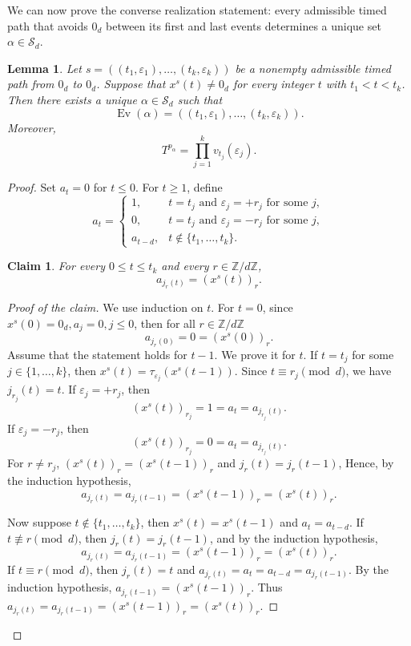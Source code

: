 \documentclass[11pt]{amsart}
\newtheorem{lemma}[theorem]{Lemma}
\newtheorem{claim}[theorem]{Claim}
\theoremstyle{definition}
\theoremstyle{remark}
\newcommand{\Z}{\mathbb Z}
\newcommand{\Sd}{\mathcal S_d}
\begin{document}
 
 We can now prove the converse realization statement: every admissible timed path that avoids $0_d$ between its first and last events determines a unique set $\alpha\in\Sd$.


\begin{lemma}\label{lem:path-realisation}
Let $s=((t_1,\varepsilon_1),\ldots,(t_k,\varepsilon_k))$ be a nonempty admissible timed path from $0_d$ to $0_d$.  Suppose that $x^s(t)\neq0_d$ for
every integer $t$ with $t_1<t<t_k$.  Then there exists a unique
$\alpha\in\Sd$ such that
\[
  \operatorname{Ev}(\alpha)
 =((t_1,\varepsilon_1),\ldots,(t_k,\varepsilon_k)).  
\]
Moreover, 
\[
 T^{p_\alpha}=\prod_{j=1}^k v_{t_j}(\varepsilon_j).   
\]
\end{lemma}

\begin{proof}
Set $a_t=0$ for $t\leq0$.  For $t\geq1$, define
\[
 a_t=
 \begin{cases}
  1,&t=t_j\text{ and }\varepsilon_j=+r_j\text{ for some }j,\\
  0,&t=t_j\text{ and }\varepsilon_j=-r_j\text{ for some }j,\\
  a_{t-d},&t\notin\{t_1,\ldots,t_k\}.
 \end{cases}
\]

\begin{claim} \label{claim:a-s}
    For every $0\leq t\leq t_k$ and every $r\in\Z/d\Z$, 
\[
 a_{j_r(t)}=(x^s(t))_r.
\]
\end{claim}
 
\begin{proof}[Proof of the claim]
 We use induction on $t$.
For $t=0$, since $x^s(0)=0_d, a_j=0, j\leq0$, then for all $r\in\mathbb Z/d\mathbb Z$
\[
a_{j_r(0)}=0=(x^s(0))_r .
\]
 Assume that the statement holds for $t-1$. We prove it for $t$.
If $t=t_j$ for some $j\in\{1,\ldots,k\}$, then $x^s(t)=\tau_{\varepsilon_j}(x^s(t-1)).$
Since $t\equiv r_j\pmod d$, we have $j_{r_j}(t)=t$.
If $\varepsilon_j=+r_j$, then
\[
(x^s(t))_{r_j}=1=a_t=a_{j_{r_j}(t)}.
\]
If $\varepsilon_j=-r_j$, then
\[
(x^s(t))_{r_j}=0=a_t=a_{j_{r_j}(t)}.
\]
For $r\neq r_j$, $(x^s(t))_r=(x^s(t-1))_r$ and $j_r(t)=j_r(t-1)$,
Hence, by the induction hypothesis,
\[
a_{j_r(t)}=a_{j_r(t-1)}=(x^s(t-1))_r=(x^s(t))_r.
\]

Now suppose $t\notin\{t_1,\ldots,t_k\}$,
then $x^s(t)=x^s(t-1)$ and $a_t=a_{t-d}$.
If $t\not\equiv r\pmod d$, then $j_r(t)=j_r(t-1)$, and by the induction hypothesis, 
\[
a_{j_r(t)}=a_{j_r(t-1)}=(x^s(t-1))_r=(x^s(t))_r.
\]
If $t\equiv r\pmod d$, then $j_r(t)=t$ and $a_{j_r(t)}=a_t=a_{t-d}=a_{j_r(t-1)}$.
By the induction hypothesis, $a_{j_r(t-1)}=(x^s(t-1))_r$.
Thus $a_{j_r(t)}=a_{j_r(t-1)}=(x^s(t-1))_r=(x^s(t))_r$.
\end{proof}


\end{proof}
\end{document}
